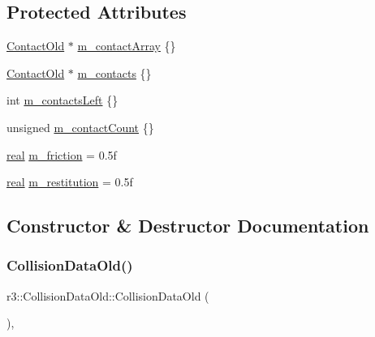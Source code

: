 \subsection*{Protected Attributes}
\begin{DoxyCompactItemize}
\item 
\mbox{\hyperlink{classr3_1_1_contact_old}{Contact\+Old}} $\ast$ \mbox{\hyperlink{classr3_1_1_collision_data_old_a2100ba5e8b3f49926d09b2ad5ca547f1}{m\+\_\+contact\+Array}} \{\}
\item 
\mbox{\hyperlink{classr3_1_1_contact_old}{Contact\+Old}} $\ast$ \mbox{\hyperlink{classr3_1_1_collision_data_old_ac0396f857d87d2a209250c9742eb7fb3}{m\+\_\+contacts}} \{\}
\item 
int \mbox{\hyperlink{classr3_1_1_collision_data_old_ad18fd7d0136d1e6d80c7c5340652a08d}{m\+\_\+contacts\+Left}} \{\}
\item 
unsigned \mbox{\hyperlink{classr3_1_1_collision_data_old_af89be6ec7df393c62d8cfa27bbf27d5f}{m\+\_\+contact\+Count}} \{\}
\item 
\mbox{\hyperlink{namespacer3_ab2016b3e3f743fb735afce242f0dc1eb}{real}} \mbox{\hyperlink{classr3_1_1_collision_data_old_a598bcf57a27bd4ed84eab8f64b334c12}{m\+\_\+friction}} = 0.\+5f
\item 
\mbox{\hyperlink{namespacer3_ab2016b3e3f743fb735afce242f0dc1eb}{real}} \mbox{\hyperlink{classr3_1_1_collision_data_old_ae4fb8abfc80fdf2637e89bd2ef621aac}{m\+\_\+restitution}} = 0.\+5f
\end{DoxyCompactItemize}


\subsection{Constructor \& Destructor Documentation}
\mbox{\label{classr3_1_1_collision_data_old_a707e8f38c09df2da7d7ae6a52e418379}} 
\subsubsection{\texorpdfstring{Collision\+Data\+Old()}{CollisionDataOld()}}
{\footnotesize\ttfamily r3\+::\+Collision\+Data\+Old\+::\+Collision\+Data\+Old (\begin{DoxyParamCaption}{ }\end{DoxyParamCaption})\hspace{0.3cm}{\ttfamily [explicit]}, {\ttfamily [default]}}


